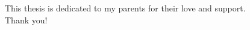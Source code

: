 \begin{dedication}
This thesis is dedicated to my parents for their love and support.\\ 
Thank you!


\end{dedication}